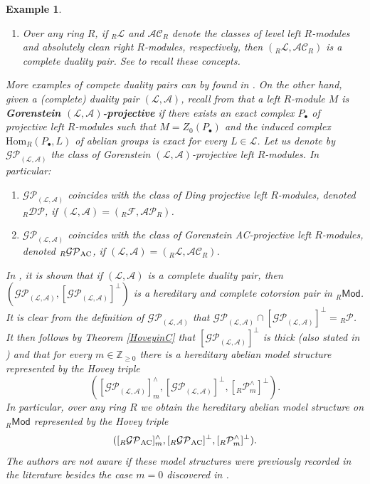 \documentclass[10pt,reqno]{amsart}
\numberwithin{equation}{section}
\newtheorem{example}[definition]{Example}
\theoremstyle{remark}
\newcommand{\Hom}{\mathrm{Hom}}
\begin{document}
\begin{example}
\begin{enumerate}[(1)]
\begin{enumerate}
\item[(ii)] Over any ring $R$, if ${}_R\mathcal{L}$ and $\mathcal{AC}_R$ denote the classes of level left $R$-modules and absolutely clean right $R$-modules, respectively, then $({}_R\mathcal{L},\mathcal{AC}_R)$ is a complete duality pair. See \cite[\S 2]{BravoGillespieHovey-arxiv} to recall these concepts. 
\end{enumerate}
More examples of compete duality pairs can by found in \cite[\S 2.1]{Gillespie-DP}. On the other hand, given a (complete) duality pair $(\mathcal{L,A})$, recall from \cite[Def. 4.2]{Gillespie-DP} that a left $R$-module $M$ is \textbf{Gorenstein $\bm{(\mathcal{L,A})}$-projective} if there exists an exact complex $P_\bullet$ of projective left $R$-modules such that $M = Z_0(P_\bullet)$ and the induced complex $\Hom_R(P_\bullet, L)$ of abelian groups is exact for every $L \in \mathcal{L}$. Let us denote by $\mathcal{GP}_{(\mathcal{L,A})}$ the class of Gorenstein $(\mathcal{L,A})$-projective left $R$-modules. In particular:
\begin{enumerate}
\item[(iii)] $\mathcal{GP}_{(\mathcal{L,A})}$ coincides with the class of Ding projective left $R$-modules, denoted ${}_R\mathcal{DP}$, if $(\mathcal{L,A}) = ({}_R\mathcal{F},\mathcal{AP}_R)$.

\item[(iv)] $\mathcal{GP}_{(\mathcal{L,A})}$ coincides with the class of Gorenstein AC-projective left $R$-modules, denoted ${}_R\mathcal{GP}_{\rm AC}$, if $(\mathcal{L,A}) = ({}_R\mathcal{L},\mathcal{AC}_R)$. 
\end{enumerate}
In \cite[dual results in \S 4]{Gillespie-DP}, it is shown that if $(\mathcal{L,A})$ is a complete duality pair, then $(\mathcal{GP}_{(\mathcal{L,A})},[\mathcal{GP}_{(\mathcal{L,A})}]^\perp)$ is a hereditary and complete cotorsion pair in ${}_R\mathsf{Mod}$. It is clear from the definition of $\mathcal{GP}_{(\mathcal{L,A})}$ that $\mathcal{GP}_{(\mathcal{L,A})} \cap [\mathcal{GP}_{(\mathcal{L,A})}]^\perp = {}_R\mathcal{P}$. It then follows by Theorem \ref{HoveyinC} that $[\mathcal{GP}_{(\mathcal{L,A})}]^\perp$ is thick (also stated in \cite[dual of Lem. 4.5]{Gillespie-DP}) and that for every $m \in \mathbb{Z}_{\geq 0}$ there is a hereditary abelian model structure represented by the Hovey triple
\[
([\mathcal{GP}_{(\mathcal{L,A})}]^\wedge_m,[\mathcal{GP}_{(\mathcal{L,A})}]^\perp,[{}_R\mathcal{P}^\wedge_m]^\perp).
\]
In particular, over any ring $R$ we obtain the hereditary abelian model structure on ${}_R\mathsf{Mod}$ represented by the Hovey triple
\[
([{}_R\mathcal{GP}_{\rm AC}]^\wedge_m,[{}_R\mathcal{GP}_{\rm AC}]^\perp,[{}_R\mathcal{P}^\wedge_m]^\perp).
\] 
The authors are not aware if these model structures were previously recorded in the literature besides the case $m = 0$ discovered in \cite[Thm. 8.5]{BravoGillespieHovey-arxiv}.


\end{enumerate}
\end{example}
\end{document}
